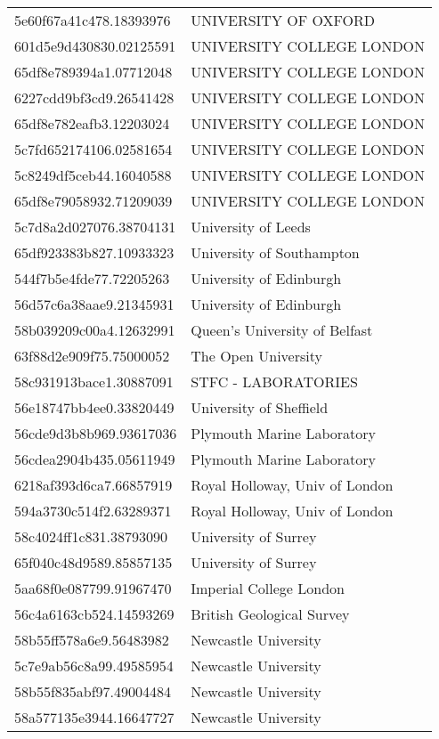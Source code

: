 \begin{tabular}{ll}
5e60f67a41c478.18393976 & UNIVERSITY OF OXFORD \\
601d5e9d430830.02125591 & UNIVERSITY COLLEGE LONDON \\
65df8e789394a1.07712048 & UNIVERSITY COLLEGE LONDON \\
6227cdd9bf3cd9.26541428 & UNIVERSITY COLLEGE LONDON \\
65df8e782eafb3.12203024 & UNIVERSITY COLLEGE LONDON \\
5c7fd652174106.02581654 & UNIVERSITY COLLEGE LONDON \\
5c8249df5ceb44.16040588 & UNIVERSITY COLLEGE LONDON \\
65df8e79058932.71209039 & UNIVERSITY COLLEGE LONDON \\
5c7d8a2d027076.38704131 & University of Leeds \\
65df923383b827.10933323 & University of Southampton \\
544f7b5e4fde77.72205263 & University of Edinburgh \\
56d57c6a38aae9.21345931 & University of Edinburgh \\
58b039209c00a4.12632991 & Queen's University of Belfast \\
63f88d2e909f75.75000052 & The Open University \\
58c931913bace1.30887091 & STFC - LABORATORIES \\
56e18747bb4ee0.33820449 & University of Sheffield \\
56cde9d3b8b969.93617036 & Plymouth Marine Laboratory \\
56cdea2904b435.05611949 & Plymouth Marine Laboratory \\
6218af393d6ca7.66857919 & Royal Holloway, Univ of London \\
594a3730c514f2.63289371 & Royal Holloway, Univ of London \\
58c4024ff1c831.38793090 & University of Surrey \\
65f040c48d9589.85857135 & University of Surrey \\
5aa68f0e087799.91967470 & Imperial College London \\
56c4a6163cb524.14593269 & British Geological Survey \\
58b55ff578a6e9.56483982 & Newcastle University \\
5c7e9ab56c8a99.49585954 & Newcastle University \\
58b55f835abf97.49004484 & Newcastle University \\
58a577135e3944.16647727 & Newcastle University \\

\end{tabular}
